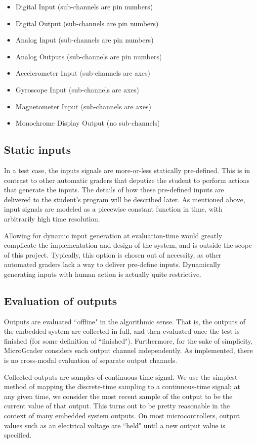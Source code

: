 \documentclass[12pt]{article}
\begin{document}
\begin{itemize}
\item Digital Input (sub-channels are pin numbers)
\item Digital Output (sub-channels are pin numbers)
\item Analog Input (sub-channels are pin numbers)
\item Analog Outputs (sub-channels are pin numbers)
\item Accelerometer Input (sub-channels are axes)
\item Gyroscope Input (sub-channels are axes)
\item Magnetometer Input (sub-channels are axes)
\item Monochrome Display Output (no sub-channels)
\end{itemize}

\subsection{Static inputs}
\label{sec:static-inputs}
In a test case, the inputs signals are more-or-less statically pre-defined.  This is in contrast to other automatic graders that deputize the student to perform actions that generate the inputs.  The details of how these pre-defined inputs are delivered to the student's program will be described later.  As mentioned above, input signals are modeled as a piecewise constant function in time, with arbitrarily high time resolution.

Allowing for dynamic input generation at evaluation-time would greatly complicate the implementation and design of the system, and is outside the scope of this project.  Typically, this option is chosen out of necessity, as other automated graders lack a way to deliver pre-define inputs.  Dynamically generating inputs with human action is actually quite restrictive.

\subsection{Evaluation of outputs}
Outputs are evaluated ``offline" in the algorithmic sense.  That is, the outputs of the embedded system are collected in full, and then evaluated once the test is finished (for some definition of ``finished").  Furthermore, for the sake of simplicity, MicroGrader considers each output channel independently.  As implemented, there is no cross-modal evaluation of separate output channels.

Collected outputs are samples of continuous-time signal.  We use the simplest method of mapping the discrete-time sampling to a continuous-time signal; at any given time, we consider the most recent sample of the output to be the current value of that output.  This turns out to be pretty reasonable in the context of many embedded system outputs.  On most microcontrollers, output values such as an electrical voltage are ``held" until a new output value is specified.
\end{document}
